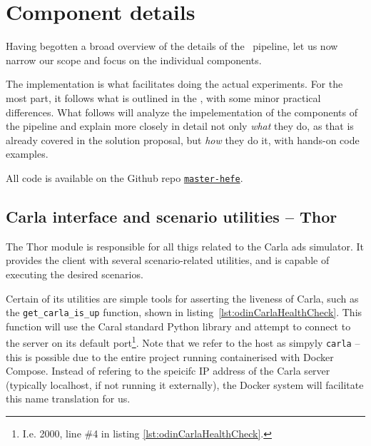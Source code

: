 \section{Component details}

Having begotten a broad overview of the details of the \hefe~pipeline, let us now narrow our scope
and focus on the individual components.



The implementation is what facilitates doing the actual experiments. For the
most part, it follows what is outlined in the , with
some minor practical differences.
What follows will analyze the impelementation of the components of the \hefe{}
pipeline and explain more closely in detail not only \emph{what} they do, as
that is already covered in the solution proposal, but \emph{how} they do it, with
hands-on code examples.

All code is available on the Github repo \href{https://github.com/orjahren/master-hefe}{\texttt{master-hefe}}.

\subsection{Carla interface and scenario utilities -- Thor}

The Thor module is responsible for all thigs related to the Carla \acrshort{ads}
simulator. It provides the client with several scenario-related utilities, and
is capable of executing the desired scenarios.


Certain of its utilities are simple tools for asserting the liveness of Carla,
such as the \texttt{get\_carla\_is\_up} function, shown in
listing~\ref{lst:odinCarlaHealthCheck}. This function will use the Caral
standard Python library and attempt to connect to the server on its default
port\footnote{I.e. \num{2000}, line \#4 in listing
    \ref{lst:odinCarlaHealthCheck}.}. Note that we refer to the host as simpyly
\texttt{carla} -- this is possible due to the entire project running
containerised with Docker Compose. Instead of refering to the speicifc IP
address of the Carla server (typically localhost, if not running it externally),
the Docker system will facilitate this name translation for us.

